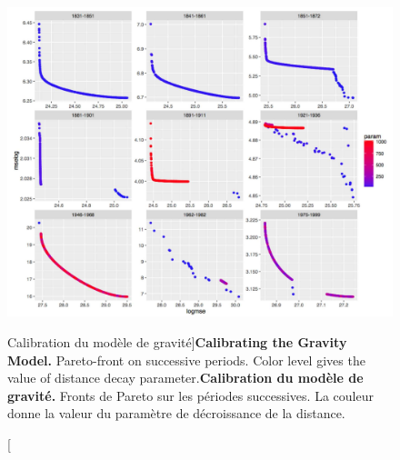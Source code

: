 \begin{figure}
\includegraphics[width=\linewidth]{Figures/Final/4-3-2-fig-interactiongibrat-gravity-pareto}
\caption[Calibrating the Gravity Model][Calibration du modèle de gravité]{\textbf{Calibrating the Gravity Model.} Pareto-front on successive periods. Color level gives the value of distance decay parameter.\label{fig:interactiongibrat:gravity-pareto}}{\textbf{Calibration du modèle de gravité.} Fronts de Pareto sur les périodes successives. La couleur donne la valeur du paramètre de décroissance de la distance.\label{fig:interactiongibrat:gravity-pareto}}
\end{figure}


